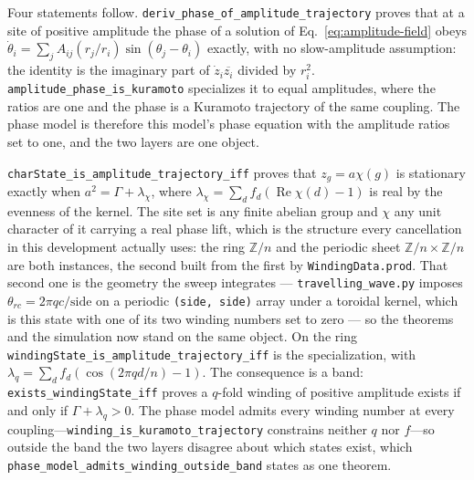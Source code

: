 \documentclass{article}
\begin{document}
Four statements follow. \nolinkurl{deriv_phase_of_amplitude_trajectory} proves that at a site of positive amplitude the phase of a solution of Eq.~\eqref{eq:amplitude-field} obeys $\dot\theta_i=\sum_j A_{ij}(r_j/r_i)\sin(\theta_j-\theta_i)$ exactly, with no slow-amplitude assumption: the identity is the imaginary part of $\dot z_i\overline{z_i}$ divided by $r_i^2$. \nolinkurl{amplitude_phase_is_kuramoto} specializes it to equal amplitudes, where the ratios are one and the phase is a Kuramoto trajectory of the same coupling. The phase model is therefore this model's phase equation with the amplitude ratios set to one, and the two layers are one object.

\nolinkurl{charState_is_amplitude_trajectory_iff} proves that $z_g=a\chi(g)$ is stationary exactly when $a^2=\Gamma+\lambda_\chi$, where $\lambda_\chi=\sum_d f_d(\operatorname{Re}\chi(d)-1)$ is real by the evenness of the kernel. The site set is any finite abelian group and $\chi$ any unit character of it carrying a real phase lift, which is the structure every cancellation in this development actually uses: the ring $\mathbb{Z}/n$ and the periodic sheet $\mathbb{Z}/n\times\mathbb{Z}/n$ are both instances, the second built from the first by \texttt{WindingData.prod}. That second one is the geometry the sweep integrates --- \texttt{travelling\_wave.py} imposes $\theta_{rc}=2\pi qc/\text{side}$ on a periodic \texttt{(side,\,side)} array under a toroidal kernel, which is this state with one of its two winding numbers set to zero --- so the theorems and the simulation now stand on the same object. On the ring \nolinkurl{windingState_is_amplitude_trajectory_iff} is the specialization, with $\lambda_q=\sum_d f_d(\cos(2\pi qd/n)-1)$. The consequence is a band: \nolinkurl{exists_windingState_iff} proves a $q$-fold winding of positive amplitude exists if and only if $\Gamma+\lambda_q>0$. The phase model admits every winding number at every coupling---\nolinkurl{winding_is_kuramoto_trajectory} constrains neither $q$ nor $f$---so outside the band the two layers disagree about which states exist, which \nolinkurl{phase_model_admits_winding_outside_band} states as one theorem.
\end{document}
